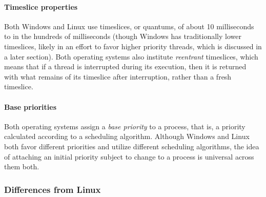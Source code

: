 \documentclass[letterpaper,10pt,titlepage]{article}
\begin{document}
\paragraph{Timeslice properties}
Both Windows and Linux use timeslices, or quantums, of about 10 milliseconds to in the hundreds of milliseconds (though Windows has traditionally lower timeslices, likely in an effort to favor higher priority threads, which is discussed in a later section). Both operating systems also institute \emph{reentrant} timeslices, which means that if a thread is interrupted during its execution, then it is returned with what remains of its timeslice after interruption, rather than a fresh timeslice.
\paragraph{Base priorities}
Both operating systems assign a \emph{base priority} to a process, that is, a priority calculated according to a scheduling algorithm. Although Windows and Linux both favor different priorities and utilize different scheduling algorithms, the idea of attaching an initial priority subject to change to a process is universal across them both.

%
%
%
\subsubsection{Differences from Linux}
\end{document}
